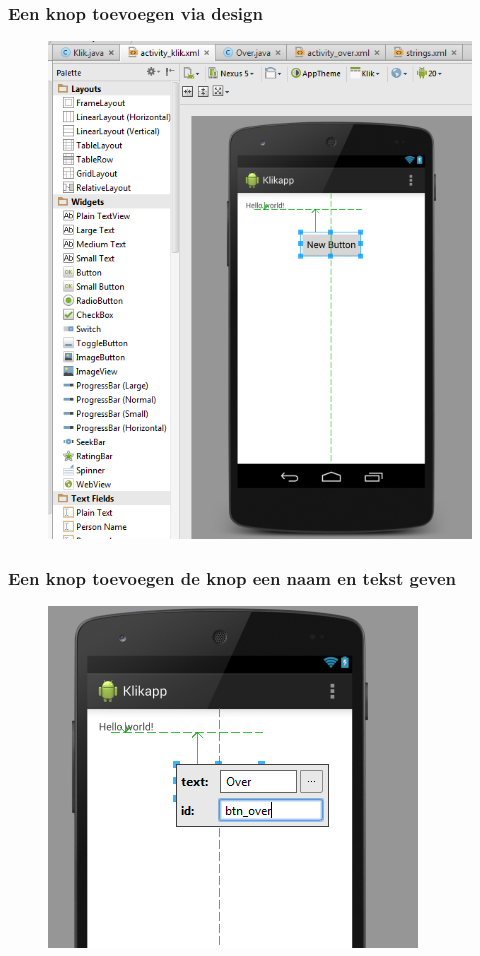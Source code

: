 \documentclass[11pt]{beamer}
\begin{document}
\begin{frame}
\frametitle{Een knop toevoegen via design}
\begin{figure}
\centering
\includegraphics[height=.9\textheight]{./addbutton2}
\label{fig:addbutton2}
\end{figure}
\end{frame}

\begin{frame}
\frametitle{Een knop toevoegen de knop een naam en tekst geven}
\begin{figure}
\centering
\includegraphics[height=.9\textheight]{./addbutton3}
\label{fig:addbutton3}
\end{figure}
\end{frame}
\end{document}
